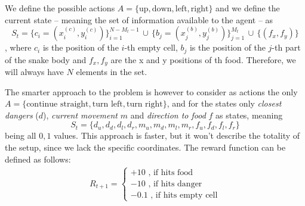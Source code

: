 \documentclass[12pt,a4paper]{article}
\begin{document}
\begin{figure}[ht]

	\label{fig:snake-grid-state}
\end{figure}
We define the possible actions $A = \{\text{up}, \text{down}, \text{left}, \text{right}\}$ and we define the current state -- meaning the set of information available to the agent -- as $$S_t = \{c_i=(x_i^{(c)},y_i^{(c)})\}_{i=1}^{N-M_t-1} \, \cup \, \{b_j=(x_j^{(b)},y_j^{(b)})\}_{j=1}^{M_t} \, \cup \, \{(f_x,f_y)\} $$, where $c_i$ is the position of the $i$-th empty cell, $b_j$ is the position of the $j$-th part of the snake body and $f_x, f_y$ are the x and y positions of th food. Therefore, we will always have $N$ elements in the set.

The smarter approach to the problem is however to consider as actions the only $A=\{\text{continue straight},\text{turn left},\text{turn right}\}$, and for the states only \textit{closest dangers} ($d$), \textit{current movement} $m$ and \textit{direction to food} $f$ as states, meaning $$S_t = \{d_u, d_d, d_l, d_r, m_u, m_d, m_l, m_r, f_u, f_d, f_l, f_r\}$$ being all $0,1$ values.
This approach is faster, but it won't describe the totality of the setup, since we lack the specific coordinates.
The reward function can be defined as follows:
\begin{align*}
	R_{t+1} = 
	\begin{cases}
		+10 \text{ , if hits food}\\[7pt]
		-10 \text{ , if hits danger}\\[7pt]
		-0.1 \text{ , if hits empty cell}
	\end{cases}
\end{align*}
\end{document}
